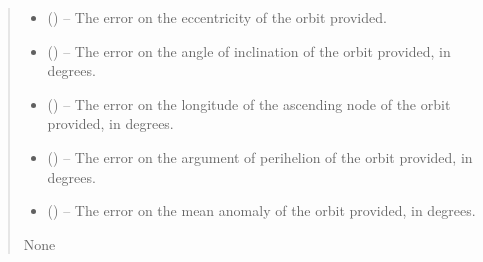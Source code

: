 \documentclass[letterpaper,11pt,english]{sphinxmanual}
\begin{document}
\begin{savenotes}
\begin{fulllineitems}
\begin{savenotes}
\begin{fulllineitems}
\begin{quote}
\begin{description}
\begin{itemize}
\item {} 
\sphinxAtStartPar
{} (\sphinxstyleliteralemphasis{\sphinxupquote{, }}) – The error on the eccentricity of the orbit provided.

\item {} 
\sphinxAtStartPar
{} (\sphinxstyleliteralemphasis{\sphinxupquote{, }}) – The error on the angle of inclination of the orbit provided, in degrees.

\item {} 
\sphinxAtStartPar
{} (\sphinxstyleliteralemphasis{\sphinxupquote{, }}) – The error on the longitude of the ascending node of the orbit
provided, in degrees.

\item {} 
\sphinxAtStartPar
{} (\sphinxstyleliteralemphasis{\sphinxupquote{, }}) – The error on the argument of perihelion of the orbit
provided, in degrees.

\item {} 
\sphinxAtStartPar
{} (\sphinxstyleliteralemphasis{\sphinxupquote{, }}) – The error on the mean anomaly of the orbit provided, in degrees.

\end{itemize}

\sphinxAtStartPar
None

\end{description}\end{quote}

\end{fulllineitems}\end{savenotes}


\end{fulllineitems}\end{savenotes}
\end{document}
